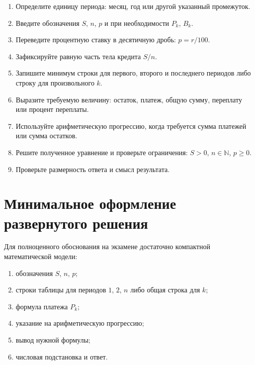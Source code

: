\documentclass[a4paper,12pt]{article}
\begin{document}
\begin{enumerate}[
  leftmargin=1.8em,
  label=\arabic*.,
  itemsep=0.35em
]
  \item Определите единицу периода: месяц, год или другой указанный
        промежуток.

  \item Введите обозначения $S$, $n$, $p$ и при необходимости
        $P_k$, $B_k$.

  \item Переведите процентную ставку в десятичную дробь:
        $p=r/100$.

  \item Зафиксируйте равную часть тела кредита $S/n$.

  \item Запишите минимум строки для первого, второго и последнего
        периодов либо строку для произвольного $k$.

  \item Выразите требуемую величину: остаток, платеж, общую сумму,
        переплату или процент переплаты.

  \item Используйте арифметическую прогрессию, когда требуется сумма
        платежей или сумма остатков.

  \item Решите полученное уравнение и проверьте ограничения:
        $S>0$, $n\in\mathbb{N}$, $p\ge0$.

  \item Проверьте размерность ответа и смысл результата.
\end{enumerate}

\section{Минимальное оформление развернутого решения}

Для полноценного обоснования на экзамене достаточно компактной
математической модели:
\begin{enumerate}[
  leftmargin=1.8em,
  label=\arabic*.,
  itemsep=0.3em
]
  \item обозначения $S$, $n$, $p$;
  \item строки таблицы для периодов $1$, $2$, $n$ либо общая строка
        для $k$;
  \item формула платежа $P_k$;
  \item указание на арифметическую прогрессию;
  \item вывод нужной формулы;
  \item числовая подстановка и ответ.
\end{enumerate}
\end{document}
